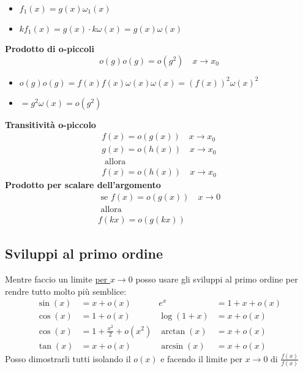 \begin{itemize}
	\item $f_1\left( x \right) = g\left( x \right) \omega_1 \left( x \right) $
	\item $kf_1\left( x \right) = g\left( x \right)\cdot k\omega \left( x \right) = g\left( x \right) \omega \left( x \right)  $
\end{itemize}
\textbf{Prodotto di o-piccoli}
\[
o\left( g \right) o\left( g \right) = o\left( g^2 \right) \quad x \to x_0
\] 
\begin{itemize}
	\item $o\left( g \right) o\left( g \right) = f\left( x \right) f\left( x \right) \omega \left( x \right) \omega \left( x \right)= \left( f\left( x \right) \right) ^2 \omega \left( x \right) ^2 $
	\item $= g^2 \omega \left( x \right) = o\left( g^2 \right)  $
\end{itemize}
\textbf{Transitività o-piccolo}
\begin{gather*}
	f\left( x \right) = o\left( g\left( x \right)  \right) \quad x \to x_0 \\
	g\left( x \right) = o\left( h\left( x \right)  \right) \quad x \to x_0	\\
	\text{ allora }\\
	f\left( x \right) = o\left( h\left( x \right)  \right) \quad x \to x_0
\end{gather*}
\textbf{Prodotto per scalare dell'argomento}
\begin{gather*}
	\text{ se }f\left( x \right) = o\left( g\left( x \right)  \right) \quad x \to 0\\
	\text{ allora }\\
	f\left( kx \right) = o\left( g\left( kx \right)  \right) 
\end{gather*}
\subsection{Sviluppi al primo ordine}
Mentre faccio un limite \underline{per $x \to 0$} posso usare gli sviluppi al primo ordine per rendre tutto molto più semblice:
\begin{align*}
	\sin\left( x \right) &= x + o\left( x \right) & e^{x}&= 1 + x + o\left( x \right) \\
	\cos\left( x \right)&=  1 + o\left( x \right) & \log\left( 1 + x \right) &= x + o\left( x \right) \\
	\cos\left( x \right)  &=  1 + \frac{x^2}{2} + o\left( x^2 \right) & \arctan\left( x \right) &= x + o\left( x \right) \\
	\tan\left( x \right) &=  x + o\left( x \right) & \arcsin \left( x \right) &=  x + o\left( x \right) 
\end{align*}
Posso dimostrarli tutti isolando il $o\left( x \right) $ e facendo il limite per $x \to 0$ di $\frac{f\left( x \right) }{f\left( x \right) }$
